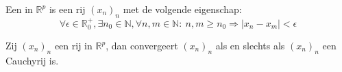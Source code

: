\documentclass[main.tex]{subfiles}
\begin{document}
\begin{de}
  Een  in $\mathbb{R}^{p}$ is een rij $(x_{n})_{n}$ met de volgende eigenschap:
  \[ \forall \epsilon \in \mathbb{R}_{0}^{+}, \exists n_{0}\in \mathbb{N}, \forall n,m \in \mathbb{N}:\ n,m \ge n_{0} \Rightarrow |x_{n}-x_{m}| < \epsilon \]
\end{de}

\begin{st}
  Zij $(x_{n})_{n}$ een rij in $\mathbb{R}^{p}$, dan convergeert $(x_{n})_{n}$ als en slechts als $(x_{n})_{n}$ een Cauchyrij is.
\end{st}

\end{document}

